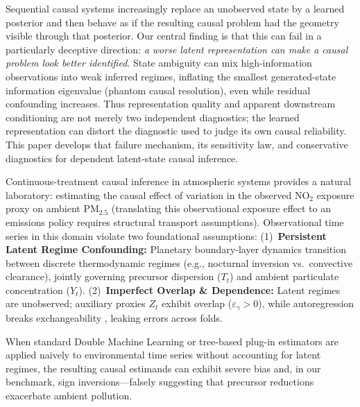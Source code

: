 \documentclass[twoside]{article}
\theoremstyle{definition}
\begin{document}
Sequential causal systems increasingly replace an unobserved state by a learned posterior and then behave as if the resulting causal problem had the geometry visible through that posterior. Our central finding is that this can fail in a particularly deceptive direction: \emph{a worse latent representation can make a causal problem look better identified}. State ambiguity can mix high-information observations into weak inferred regimes, inflating the smallest generated-state information eigenvalue (phantom causal resolution), even while residual confounding increases. Thus representation quality and apparent downstream conditioning are not merely two independent diagnostics; the learned representation can distort the diagnostic used to judge its own causal reliability. This paper develops that failure mechanism, its sensitivity law, and conservative diagnostics for dependent latent-state causal inference.

Continuous-treatment causal inference in atmospheric systems provides a natural laboratory: estimating the causal effect of variation in the observed $\text{NO}_2$ exposure proxy on ambient $\text{PM}_{2.5}$ \citep{dominici2014mitigating} (translating this observational exposure effect to an emissions policy requires structural transport assumptions). Observational time series in this domain violate two foundational assumptions: (1)~\textbf{Persistent Latent Regime Confounding:} Planetary boundary-layer dynamics transition between discrete thermodynamic regimes (e.g., nocturnal inversion vs.\ convective clearance), jointly governing precursor dispersion ($T_t$) and ambient particulate concentration ($Y_t$). (2)~\textbf{Imperfect Overlap \& Dependence:} Latent regimes are unobserved; auxiliary proxies $Z_t$ exhibit overlap ($\varepsilon_\gamma > 0$), while autoregression breaks exchangeability \citep{chernozhukov2018double}, leaking errors across folds.

When standard Double Machine Learning \citep{chernozhukov2018double} or tree-based plug-in estimators are applied naively to environmental time series without accounting for latent regimes, the resulting causal estimands can exhibit severe bias and, in our benchmark, sign inversions—falsely suggesting that precursor reductions exacerbate ambient pollution.
\end{document}

